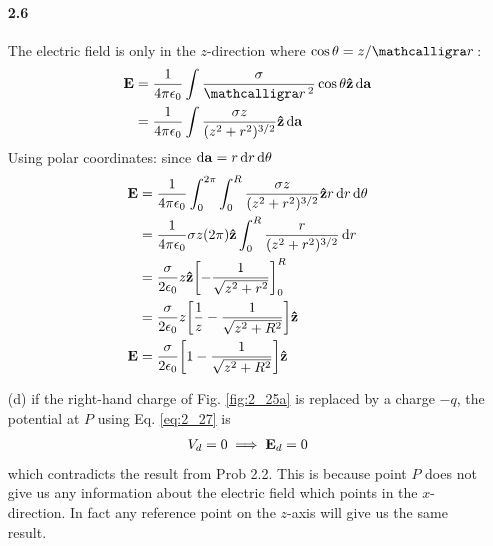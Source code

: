 \documentclass[../main.tex]{subfiles}
\begin{document}
\begin{enumerate}
    \paragraph{2.6}
The electric field is only in the $z$-direction where $\cos\theta = z/\scriptr$:
\begin{align*}
    \vb{E} &= \frac{1}{4\pi\epsilon_0}
        \int \frac{\sigma}{\scriptr^2} \cos\theta \vu{z} \dd{\vb{a}} \\
    &= \frac{1}{4\pi\epsilon_0}
        \int \frac{\sigma z}{(z^2 + r^2)^{3/2}} \vu{z} \dd{\vb{a}}
\end{align*}
Using polar coordinates: since $\dd{\vb{a}} = r \dd{r} \dd{\theta} $
\begin{align*}
    \vb{E} &= \frac{1}{4\pi\epsilon_0}
        \int_0^{2\pi} \int_0^R \frac{\sigma z}{(z^2 + r^2)^{3/2}} \vu{z} r \dd{r} \dd{\theta} \\
    &= \frac{1}{4\pi\epsilon_0}
        \sigma z (2\pi) \vu{z} \int_0^R \frac{r}{(z^2 + r^2)^{3/2}} \dd{r} \\
    &= \frac{\sigma}{2\epsilon_0} z \vu{z} \qt[
            -\frac{1}{\sqrt{z^2 + r^2}}
        ]_0^R \\
    &= \frac{\sigma}{2\epsilon_0} z  \qt[
            \frac{1}{z} -\frac{1}{\sqrt{z^2 + R^2}}
        ] \vu{z} \\
    \vb E &= \frac{\sigma}{2\epsilon_0} \qt[1 - \frac{1}{\sqrt{z^2 + R^2}}] \vu{z}
\end{align*}
    \item[(d)] if the right-hand charge of Fig. \ref{fig:2_25a} is replaced by a charge $-q$, the potential at $P$ using Eq. \eqref{eq:2_27} is
    \begin{align*}
        V_d = 0 \implies \vb E_d = 0
    \end{align*}
    which contradicts the result from Prob 2.2. This is because point $P$ does not give us any information about the electric field which points in the $x$-direction.
    In fact any reference point on the $z$-axis will give us the same result. 
\end{enumerate}
\end{document}
